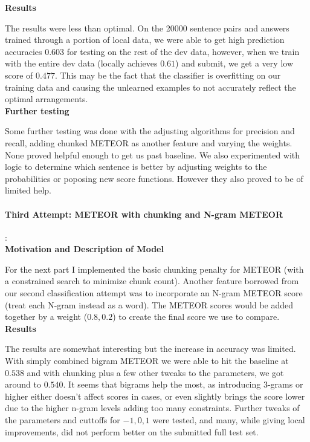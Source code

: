 \documentclass{article}
\begin{document}
{\bf Results} 

The results were less than optimal. On the 20000 sentence pairs and answers trained through a portion of local data, we were able to get high prediction accuracies $0.603$ for testing on the rest of the dev data, however, when we train with the entire dev data (locally achieves $0.61$) and submit, we get a very low score of $0.477$. This may be the fact that the classifier is overfitting on our training data and causing the unlearned examples to not accurately reflect the optimal arrangements.\\

{\bf Further testing}

Some further testing was done with the adjusting algorithms for precision and recall, adding chunked METEOR as another feature and varying the weights. None proved helpful enough to get us past baseline. We also experimented with logic to determine which sentence is better by adjusting weights to the probabilities or poposing new score functions. However they also proved to be of limited help.\\

\paragraph{Third Attempt: METEOR with chunking and N-gram METEOR}

:\\

{\bf Motivation and Description of Model} 

For the next part I implemented the basic chunking penalty for METEOR (with a constrained search to minimize chunk count). Another feature borrowed from our second classification attempt was to incorporate an N-gram METEOR score (treat each N-gram instead as a word). The METEOR scores would be added together by a weight ($0.8, 0.2$) to create the final score we use to compare.\\

{\bf Results} 

The results are somewhat interesting but the increase in accuracy was limited. With simply combined bigram METEOR we were able to hit the baseline at $0.538$ and with chunking plus a few other tweaks to the parameters, we got around to $0.540$. It seems that bigrams help the most, as introducing 3-grams or higher either doesn't affect scores in cases, or even slightly brings the score lower due to the higher n-gram levels adding too many constraints. Further tweaks of the parameters and cuttoffs for $-1, 0, 1$ were tested, and many, while giving local improvements, did not perform better on the submitted full test set. \\
\end{document}
